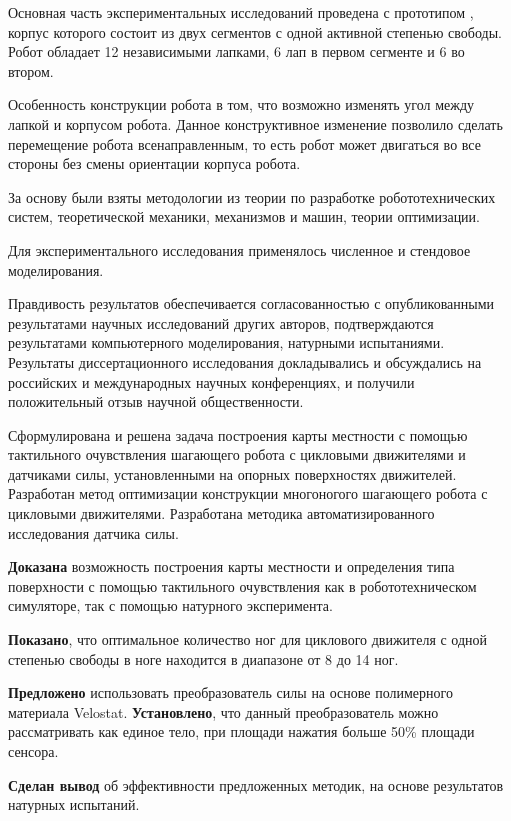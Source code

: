 Основная часть экспериментальных исследований проведена с прототипом , корпус которого состоит из двух сегментов с одной активной степенью свободы. Робот обладает 12 независимыми лапками, 6 лап в первом сегменте и 6 во втором.

Особенность конструкции робота в том, что возможно изменять угол между лапкой и корпусом робота. Данное конструктивное изменение позволило сделать перемещение робота всенаправленным, то есть робот может двигаться во все стороны без смены ориентации корпуса робота.


{\methods} За основу были взяты методологии из теории по разработке робототехнических систем, теоретической механики, механизмов и машин, теории оптимизации.

Для экспериментального исследования применялось численное и стендовое моделирования.

{\reliability} Правдивость результатов обеспечивается согласованностью с опубликованными результатами научных исследований других авторов, подтверждаются результатами компьютерного моделирования, натурными испытаниями. Результаты диссертационного исследования докладывались и обсуждались на российских и международных научных конференциях, и получили положительный отзыв научной общественности.


{\novelty} Сформулирована и решена задача построения карты местности с помощью тактильного очувствления шагающего робота с цикловыми движителями и датчиками силы, установленными на опорных поверхностях движителей.
Разработан метод оптимизации конструкции многоногого шагающего робота с цикловыми движителями. 
Разработана методика автоматизированного исследования датчика силы.


\textbf{Доказана} возможность построения карты местности и определения типа поверхности с помощью тактильного очувствления как в робототехническом симуляторе, так с помощью натурного эксперимента.

\textbf{Показано}, что оптимальное количество ног для циклового движителя с одной степенью свободы в ноге находится в диапазоне от 8 до 14 ног. 

\textbf{Предложено} использовать преобразователь силы на основе полимерного материала Velostat. \textbf{Установлено}, что данный преобразователь можно рассматривать как единое тело, при площади нажатия больше 50\% площади сенсора. 

\textbf{Сделан вывод} об эффективности предложенных методик, на основе результатов натурных испытаний.

